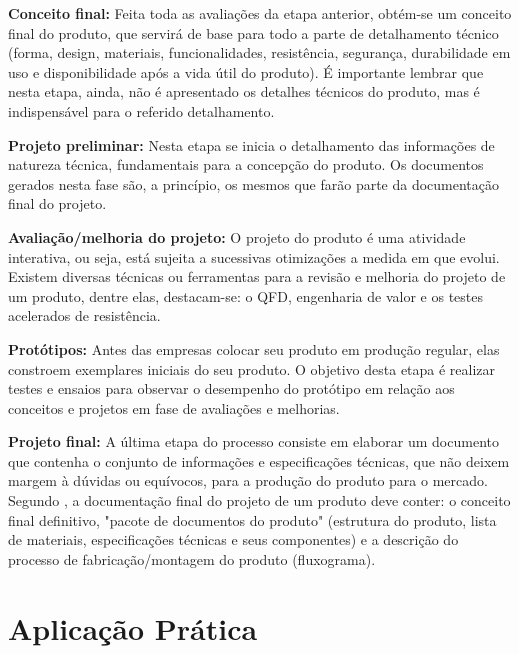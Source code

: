 \textbf{Conceito final:} Feita toda as avaliações da etapa anterior, obtém-se um conceito final do produto, que servirá de base para todo a parte de detalhamento técnico (forma, design, materiais, funcionalidades, resistência, segurança, durabilidade em uso e disponibilidade após a vida útil do produto). É importante lembrar que nesta etapa, ainda, não é apresentado os detalhes técnicos do produto, mas é indispensável para o referido detalhamento.

\textbf{Projeto preliminar:} Nesta etapa se inicia o detalhamento das informações de natureza técnica, fundamentais para a concepção do produto. Os documentos gerados nesta fase são, a princípio, os mesmos que farão parte da documentação final do projeto.

\textbf{Avaliação/melhoria do projeto:} O projeto do produto é uma atividade interativa, ou seja, está sujeita a sucessivas otimizações a medida em que evolui. Existem diversas técnicas ou ferramentas para a revisão e melhoria do projeto de um produto, dentre elas, destacam-se: o \ac{QFD}, engenharia de valor e os testes acelerados de resistência.

\textbf{Protótipos:} Antes das empresas colocar seu produto em produção regular, elas constroem exemplares iniciais do seu produto. O objetivo desta etapa é realizar testes e ensaios para observar o desempenho do protótipo em relação aos conceitos e projetos em fase de avaliações e melhorias.

\textbf{Projeto final:} A última etapa do processo consiste em elaborar um documento que contenha o conjunto de informações e especificações técnicas, que não deixem margem à dúvidas ou equívocos, para a produção do produto para o mercado. Segundo \cite{slack2006administracao}, a documentação final do projeto de um produto deve conter: o conceito final definitivo, "pacote de documentos do produto" (estrutura do produto, lista de materiais, especificações técnicas e seus componentes) e a descrição do processo de fabricação/montagem do produto (fluxograma). 


\section{Aplicação Prática} 
\label{sec:projeto_do_produto_aplicacao}
